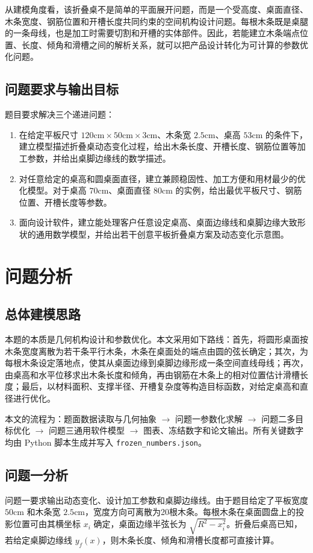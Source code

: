 \documentclass[UTF8,a4paper,12pt]{ctexart}
\newcommand{\cm}{\mathrm{cm}}
\begin{document}
从建模角度看，该折叠桌不是简单的平面展开问题，而是一个受高度、桌面直径、木条宽度、钢筋位置和开槽长度共同约束的空间机构设计问题。每根木条既是桌腿的一条母线，也是加工时需要切割和开槽的实体部件。因此，若能建立木条端点位置、长度、倾角和滑槽之间的解析关系，就可以把产品设计转化为可计算的参数优化问题。

\subsection{问题要求与输出目标}
题目要求解决三个递进问题：
\begin{enumerate}
\item 在给定平板尺寸 $120\cm\times50\cm\times3\cm$、木条宽 $2.5\cm$、桌高 $53\cm$ 的条件下，建立模型描述折叠桌动态变化过程，给出木条长度、开槽长度、钢筋位置等加工参数，并给出桌脚边缘线的数学描述。
\item 对任意给定的桌高和圆桌面直径，建立兼顾稳固性、加工方便和用材最少的优化模型。对于桌高 $70\cm$、桌面直径 $80\cm$ 的实例，给出最优平板尺寸、钢筋位置、开槽长度等参数。
\item 面向设计软件，建立能处理客户任意设定桌高、桌面边缘线和桌脚边缘大致形状的通用数学模型，并给出若干创意平板折叠桌方案及动态变化示意图。
\end{enumerate}

\section{问题分析}
\subsection{总体建模思路}
本题的本质是几何机构设计和参数优化。本文采用如下路线：首先，将圆形桌面按木条宽度离散为若干条平行木条，木条在桌面处的端点由圆的弦长确定；其次，为每根木条设定落地点，使其从桌面边缘到桌脚边缘形成一条空间直线母线；再次，由桌高和水平位移求出木条长度和倾角，再由钢筋在木条上的相对位置估计滑槽长度；最后，以材料面积、支撑半径、开槽复杂度等构造目标函数，对给定桌高和直径进行优化。

本文的流程为：题面数据读取与几何抽象 $\rightarrow$ 问题一参数化求解 $\rightarrow$ 问题二多目标优化 $\rightarrow$ 问题三通用软件模型 $\rightarrow$ 图表、冻结数字和论文输出。所有关键数字均由 Python 脚本生成并写入 \texttt{frozen\_numbers.json}。

\subsection{问题一分析}
问题一要求输出动态变化、设计加工参数和桌脚边缘线。由于题目给定了平板宽度 $50\cm$ 和木条宽 $2.5\cm$，宽度方向可离散为20根木条。每根木条在桌面圆盘上的投影位置可由其横坐标 $x_i$ 确定，桌面边缘半弦长为 $\sqrt{R^2-x_i^2}$。折叠后桌高已知，若给定桌脚边缘线 $y_f(x)$，则木条长度、倾角和滑槽长度都可直接计算。
\end{document}
